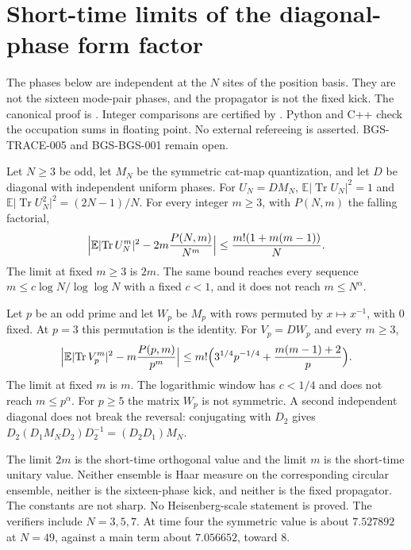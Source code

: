 \section{Short-time limits of the diagonal-phase form factor}
\label{sec:diagonal-phase-short-time}
The phases below are independent at the \(N\) sites of the position basis.
They are not the sixteen mode-pair phases, and the propagator is not the fixed kick.
The canonical proof is
.
Integer comparisons are certified by
.
Python and C++ check the occupation sums in floating point. No external refereeing is asserted.
BGS-TRACE-005 and BGS-BGS-001 remain open.

\begin{theorem}
\label{thm:diagonal-phase-short-time}
Let \(N\ge 3\) be odd, let \(M_N\) be the symmetric cat-map quantization, and let
\(D\) be diagonal with independent uniform phases. For \(U_N=DM_N\),
\(\mathbb E\lvert\operatorname{Tr} U_N\rvert^2=1\) and
\(\mathbb E\lvert\operatorname{Tr} U_N^2\rvert^2=(2N-1)/N\). For every integer
\(m\ge 3\), with \(P(N,m)\) the falling factorial,
\[
\Bigl\lvert\mathbb E\lvert\operatorname{Tr} U_N^m\rvert^2
-2m\frac{P(N,m)}{N^m}\Bigr\rvert
\le\frac{m!(1+m(m-1))}{N}.
\]
The limit at fixed \(m\ge 3\) is \(2m\). The same bound reaches every sequence
\(m\le c\log N/\log\log N\) with a fixed \(c<1\), and it does not reach
\(m\le N^{\alpha}\).

Let \(p\) be an odd prime and let \(W_p\) be \(M_p\) with rows permuted by
\(x\mapsto x^{-1}\), with \(0\) fixed. At \(p=3\) this permutation is the
identity. For \(V_p=DW_p\) and every \(m\ge 3\),
\[
\Bigl\lvert\mathbb E\lvert\operatorname{Tr} V_p^m\rvert^2
-m\frac{P(p,m)}{p^m}\Bigr\rvert
\le m!\Bigl(3^{1/4}p^{-1/4}+\frac{m(m-1)+2}{p}\Bigr).
\]
The limit at fixed \(m\) is \(m\). The logarithmic window has \(c<1/4\) and
does not reach \(m\le p^{\alpha}\). For \(p\ge 5\) the matrix \(W_p\) is not
symmetric. A second independent diagonal does not break the reversal:
conjugating with \(D_2\) gives \(D_2(D_1M_ND_2)D_2^{-1}=(D_2D_1)M_N\).

The limit \(2m\) is the short-time orthogonal value and the limit \(m\) is the
short-time unitary value. Neither ensemble is Haar measure on the
corresponding circular ensemble, neither is the sixteen-phase kick, and
neither is the fixed propagator. The constants are not sharp. No
Heisenberg-scale statement is proved. The verifiers include \(N=3,5,7\). At
time four the symmetric value is about \(7.527892\) at \(N=49\), against a
main term about \(7.056652\), toward \(8\).
\end{theorem}
